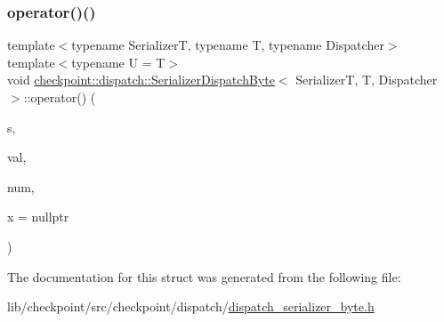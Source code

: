 \subsubsection{\texorpdfstring{operator()()}{operator()()}\hspace{0.1cm}{\footnotesize\ttfamily [2/2]}}
{\footnotesize\ttfamily template$<$typename SerializerT, typename T, typename Dispatcher$>$ \\
template$<$typename U  = T$>$ \\
void \hyperlink{structcheckpoint_1_1dispatch_1_1_serializer_dispatch_byte}{checkpoint\+::dispatch\+::\+Serializer\+Dispatch\+Byte}$<$ SerializerT, T, Dispatcher $>$\+::operator() (\begin{DoxyParamCaption}\item[{SerializerT \&}]{s,  }\item[{T $\ast$}]{val,  }\item[{\hyperlink{namespacecheckpoint_a083f6674da3f94c2901b18c6d238217c}{Serial\+Size\+Type}}]{num,  }\item[{\hyperlink{structcheckpoint_1_1dispatch_1_1_serializer_dispatch_byte_ab1c9cd927c357c30c095356c44252ccd}{is\+Not\+Byte\+Copy\+Type}$<$ U $>$ $\ast$}]{x = {\ttfamily nullptr} }\end{DoxyParamCaption})\hspace{0.3cm}{\ttfamily [inline]}}



The documentation for this struct was generated from the following file\+:\begin{DoxyCompactItemize}
\item 
lib/checkpoint/src/checkpoint/dispatch/\hyperlink{dispatch__serializer__byte_8h}{dispatch\+\_\+serializer\+\_\+byte.\+h}\end{DoxyCompactItemize}
